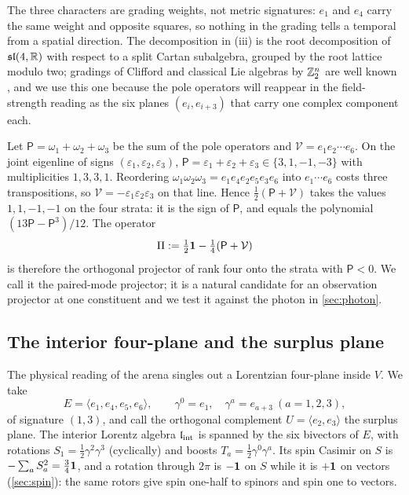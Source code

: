 The three characters are grading weights, not metric signatures: $e_1$ and $e_4$ carry the same weight and opposite squares,
so nothing in the grading tells a temporal from a spatial direction. The decomposition in (iii) is the root decomposition of
$\mathfrak{sl}(4,\mathbb{R})$ with respect to a split Cartan subalgebra, grouped by the root lattice modulo two; gradings of Clifford and
classical Lie algebras by $\mathbb{Z}_2^n$ are well known \cite{MosnaMirallesVaz}, and we use this one because the pole operators will
reappear in the field-strength reading as the six planes $(e_i,e_{i+3})$ that carry one complex component each.

\begin{example}
\label{ex:pairedmode}
Let $\mathsf P=\omega_1+\omega_2+\omega_3$ be the sum of the pole operators and $\mathcal V=e_1e_2\cdots e_6$. On the joint
eigenline of signs $(\varepsilon_1,\varepsilon_2,\varepsilon_3)$, $\mathsf P=\varepsilon_1+\varepsilon_2+\varepsilon_3\in\{3,1,-1,-3\}$
with multiplicities $1,3,3,1$. Reordering $\omega_1\omega_2\omega_3=e_1e_4e_2e_5e_3e_6$ into $e_1\cdots e_6$ costs three
transpositions, so $\mathcal V=-\varepsilon_1\varepsilon_2\varepsilon_3$ on that line. Hence $\tfrac12(\mathsf P+\mathcal V)$ takes the
values $1,1,-1,-1$ on the four strata: it is the sign of $\mathsf P$, and equals the polynomial $(13\mathsf P-\mathsf P^3)/12$.
The operator
\begin{equation}
\label{eq:Piclosed}
\Pi:=\tfrac12\mathbf 1-\tfrac14(\mathsf P+\mathcal V)
\end{equation}
is therefore the orthogonal projector of rank four onto the strata with $\mathsf P<0$. We call it the paired-mode projector; it
is a natural candidate for an observation projector at one constituent and we test it against the photon in
\cref{sec:photon}.
\end{example}

\subsection{The interior four-plane and the surplus plane}
\label{sec:interior}

The physical reading of the arena singles out a Lorentzian four-plane inside $V$. We take
\[
E=\langle e_1,e_4,e_5,e_6\rangle,\qquad \gamma^0=e_1,\quad \gamma^a=e_{a+3}\ (a=1,2,3),
\]
of signature $(1,3)$, and call the orthogonal complement $U=\langle e_2,e_3\rangle$ the surplus plane. The interior Lorentz
algebra $\mathfrak l_{\rm int}$ is spanned by the six bivectors of $E$, with rotations $S_1=\tfrac12\gamma^2\gamma^3$ (cyclically) and boosts
$T_a=\tfrac12\gamma^0\gamma^a$. Its spin Casimir on $S$ is $-\sum_aS_a^2=\tfrac34\mathbf 1$, and a rotation through $2\pi$ is $-\mathbf 1$
on $S$ while it is $+\mathbf 1$ on vectors (\cref{sec:spin}): the same rotors give spin one-half to spinors and spin one to vectors.

